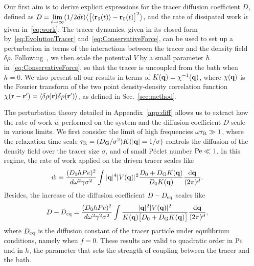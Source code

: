 \documentclass[pre, superscriptaddress, twocolumn,pre]{revtex4-1}
\newcommand{\dd}{\text{d}}
\begin{document}
Our first aim is to derive explicit expressions for the tracer diffusion coefficient $D$, defined as $D = \underset{t\to\infty}{\lim} (1/2dt) \big\langle \big[\langle{\bf r}_0(t)\rangle-{\bf r}_0(t)\big]^2 \big\rangle$, and the rate of dissipated work $\dot w$ given in~\eqref{eq:work}. The tracer dynamics, given in its closed form by~\eqref{eq:EvolutionTracer} and~\eqref{eq:ConservativeForce}, can be used to set up a perturbation in terms of the interactions between the tracer and the density field $\delta\rho$. Following~\cite{Demery2011, Demery2014}, we then scale the potential $V$ by a small parameter $h$ in~\eqref{eq:ConservativeForce}, so that the tracer is uncoupled from the bath when $h=0$. We also present all our results in terms of $K({\bf q}) = \chi^{-1}({\bf q})$, where $\chi({\bf q})$ is the Fourier transform of the two point density-density correlation function $\chi({\bf r}-{\bf r}')= \langle \delta \rho({\bf r}) \delta \rho ({\bf r}')\rangle$, as defined in Sec.~\ref{sec:method}. 


The perturbation theory detailed in Appendix~\ref{app:diff} allows us to extract how the rate of work $\dot w$ performed on the system and the diffusion coefficient $D$ scale in various limits. We first consider the limit of high frequencies $\omega\tau_{\rm R}\gg 1$, where the relaxation time scale $\tau_{\rm R}=(D_{\rm G}/\sigma^2)K(|{\bf q}|=1/\sigma)$ controls the diffusion of the density field over the tracer size $\sigma$, and of small P\'eclet number ${\rm Pe}\ll 1$. In this regime, the rate of work applied on the driven tracer scales like
\begin{equation}\label{eq:w_small}
	\dot w = \frac{(D_0 hPe)^2}{d\omega^2\gamma\sigma^2} \int|{\bf q}|^4 |V({\bf q})|^2 \frac{D_0 + D_{\rm G}K({\bf q})}{D_0K({\bf q})} \frac{\dd{\bf q}}{(2\pi)^d} .
\end{equation}
Besides, the increase of the diffusion coefficient $D-D_{\rm eq}$ scales like 
\begin{equation}\label{eq:D_small}
	D-D_{\rm eq} = \frac{(D_0 h Pe)^2}{d\omega^2\gamma^2\sigma^2} \int\frac{|{\bf q}|^2 |V({\bf q})|^2 } {K({\bf q})\big[D_0 + D_{\rm G} K({\bf q})\big]} \frac{\dd{\bf q}}{(2\pi)^d} ,
\end{equation}
where $D_{\rm eq}$ is the diffusion constant of the tracer particle under equilibrium conditions, namely when $f=0$. These results are valid to quadratic order in $\rm Pe$ and in $h$, the parameter that sets the strength of coupling between the tracer and the bath.
\end{document}
